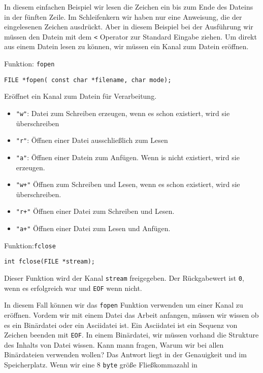 In diesem einfachen Beispiel wir lesen die Zeichen ein bis zum Ende des Dateins in der fünften Zeile.
Im Schleifenkern wir haben nur eine Anweisung, die der eingelesenen Zeichen ausdrückt. Aber in diesem Beispiel
bei der Ausführung wir müssen den Datein mit dem \texttt{<} Operator zur Standard Eingabe ziehen. Um direkt aus
einem Datein lesen zu können, wir müssen ein Kanal zum Datein eröffnen.
\begin{myexampleblock}{Funktion: \texttt{fopen}}
\begin{lstlisting}
FILE *fopen( const char *filename, char mode);
\end{lstlisting}
\vspace{-0.4cm}
Eröffnet ein Kanal zum Datein für Verarbeitung.
\begin{itemize} 
\itemsep0.5ex
\item \texttt{"w"}: Datei zum Schreiben erzeugen, wenn es schon existiert, wird sie überschreiben
\item \texttt{"r"}: Öffnen einer Datei ausschließlich zum Lesen
\item \texttt{"{}a"}: Öffnen einer Datein zum Anfügen. Wenn is nicht existiert, wird sie erzeugen.
\item \texttt{"w+"} Öffnen zum Schreiben und Lesen, wenn es schon existiert, wird sie überschreiben.
\item \texttt{"r+"} Öffnen einer Datei zum Schreiben und Lesen.
\item \texttt{"{}a+"} Öffnen einer Datei zum Lesen und Anfügen.
\end{itemize}
\end{myexampleblock}  
\begin{myexampleblock}{Funktion:\texttt{fclose}}
\begin{lstlisting}
int fclose(FILE *stream);
\end{lstlisting}
\vspace{-0.4cm}
Dieser Funktion wird der Kanal \texttt{stream} freigegeben. Der Rückgabewert ist \texttt{0}, wenn es
erfolgreich war und \texttt{EOF} wenn nicht.
\end{myexampleblock}
In diesem Fall können wir das \texttt{fopen} Funktion verwenden um einer Kanal zu eröffnen. Vordem
wir mit einem Datei das Arbeit anfangen, müssen wir wissen ob es ein Binärdatei oder ein Asciidatei
ist. Ein Asciidatei ist ein Sequenz von Zeichen beenden mit \texttt{EOF}. In einem Binärdatei, wir müssen vorhand
die Strukture des Inhalts von Datei wissen. Kann mann fragen, Warum wir bei allen Binärdateien verwenden wollen?
Das Antwort liegt in der Genauigkeit und im Speicherplatz. Wenn wir eine 8 \texttt{byte} größe Fließkommazahl in 
